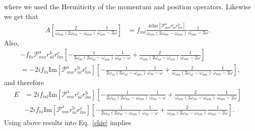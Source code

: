 where we used the Hermiticity of the momentum and position operators.
Likewise we get that
\begin{align}\label{si}
A
\left[
\frac{2}{\omega_{nm}(2\omega_{lm}-\omega_{nm})}\frac{1}{\omega_{nm}-2\omega}
\right]&=
f_{ml}
\frac{4i\mathrm{Im}[\mathcal{P}^{\mathrm{a}}_{mn}r^{\mathrm{c}}_{nl}r^{\mathrm{b}}_{lm}]}{\omega_{nm}(2\omega_{lm}-\omega_{nm})}\frac{1}{\omega_{nm}-2\omega}
.
\end{align}
Also,
\begin{align}\label{is}
&-
f_{ln}\mathcal{P}^{\mathrm{a}}_{mn}r^{\mathrm{b}}_{nl}r^{\mathrm{c}}_{lm}
\left[
-\frac{1}{2\omega_{nl}(2\omega_{nl}-\omega_{nm})}\frac{1}{\omega_{nl}-\omega}
+\frac{2}{\omega_{nm}(2\omega_{nl}-\omega_{nm})}\frac{1}{\omega_{nm}-2\omega}
\right]
\nonumber\\
&=
-
2if_{ln}\mathrm{Im}[\mathcal{P}^{\mathrm{a}}_{mn}r^{\mathrm{b}}_{nl}r^{\mathrm{c}}_{lm}]
\left[
-\frac{1}{2\omega_{nl}(2\omega_{nl}-\omega_{nm})}\frac{1}{\omega_{nl}-\omega}
+\frac{2}{\omega_{nm}(2\omega_{nl}-\omega_{nm})}\frac{1}{\omega_{nm}-2\omega}
\right]
,
\end{align}
and therefore
\begin{align}\label{pfen}  
E&=  
2if_{ml}\mathrm{Im}[\mathcal{P}^{\mathrm{a}}_{mn}r^{\mathrm{c}}_{nl}r^{\mathrm{b}}_{lm}] 
\left[
-\frac{1}{2\omega_{lm}(2\omega_{lm}-\omega_{nm})}\frac{1}{\omega_{lm}-\omega}
+\frac{2}{\omega_{nm}(2\omega_{lm}-\omega_{nm})}\frac{1}{\omega_{nm}-2\omega}
\right]
\nonumber\\
&- 
2if_{ln}\mathrm{Im}[\mathcal{P}^{\mathrm{a}}_{mn}r^{\mathrm{b}}_{nl}r^{\mathrm{c}}_{lm}]
\left[
-\frac{1}{2\omega_{nl}(2\omega_{nl}-\omega_{nm})}\frac{1}{\omega_{nl}-\omega}
+\frac{2}{\omega_{nm}(2\omega_{nl}-\omega_{nm})}\frac{1}{\omega_{nm}-2\omega}
\right]
.
\end{align}  
Using above results into Eq.~\eqref{chie} implies
